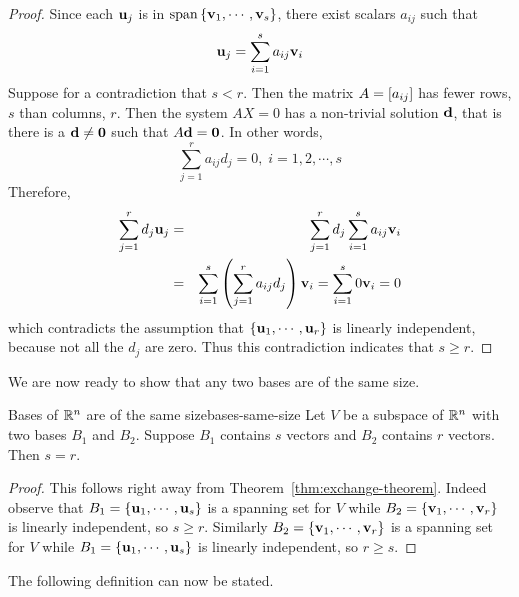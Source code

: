 \begin{proof}
  Since each $\mbox{\bf u}_j$ is in
  $\sspan\set{\vect{v}_{1},\cdots ,\vect{v}_{s}} $, there exist
  scalars $a_{ij}$ such that
  \begin{equation*}
    \mbox{\bf u}_{j}=\sum_{i=1}^{s}a_{ij}\mbox{\bf v}_{i}
  \end{equation*}
  Suppose for a contradiction that $s<r$. Then the matrix
  $A = \left[ a_{ij} \right]$ has fewer rows, $s$ than columns, $r$. Then the
  system $AX=0$ has %
  a non-trivial solution $\mbox{\bf d}$, that is there is a
  $\mbox{\bf d}\neq \mbox{\bf 0}$ such that $A\mbox{\bf d}=\mbox{\bf 0}$. In other
  words,
  \begin{equation*}
    \sum_{j=1}^{r}a_{ij}d_{j}=0,\;i=1,2,\cdots ,s
  \end{equation*}
  Therefore, 
  \begin{eqnarray*}
    \sum_{j=1}^{r}d_{j}\mbox{\bf u}_{j}
    &=&\sum_{j=1}^{r}d_{j}\sum_{i=1}^{s}a_{ij}
        \mbox{\bf v}_{i} \\
    &=&\sum_{i=1}^{s}\left(\sum_{j=1}^{r}a_{ij}d_{j}\right) \mbox{\bf v}
        _{i}=\sum_{i=1}^{s}0\mbox{\bf v}_{i}=0
  \end{eqnarray*}
  which contradicts the assumption that
  $\left\{\mbox{\bf u}_{1},\cdots ,\mbox{\bf u}_{r}\right\} $ is linearly independent,
  because not all the $d_{j}$ are zero. Thus this contradiction
  indicates that $s\geq r$.
\end{proof}

We are now ready to show that any two bases are of the same size.

\begin{theorem}{Bases of $\mathbb{R}^{n}$ are of the same size}{bases-same-size}
  Let $V$ be a subspace of $\mathbb{R}^{n}$ with two bases $B_1$ and
  $B_2$. Suppose $B_1$ contains $s$ vectors and $B_2$ contains $r$
  vectors. Then $s=r$.
\end{theorem}

\begin{proof}
  This follows right away from
  Theorem~\ref{thm:exchange-theorem}. Indeed observe that
  $B_1 = \left\{ \mbox{\bf u}_{1},\cdots ,\mbox{\bf u}_{s}\right\} $ is a spanning set
  for $V$ while $ B_2 = \left\{\mbox{\bf v}_{1},\cdots ,\mbox{\bf v}_{r}\right\} $ is
  linearly independent, so $s \geq r$. Similarly
  $B_2 = \left\{\mbox{\bf v}_{1},\cdots ,\mbox{\bf v} _{r}\right\} $ is a spanning set
  for $V$ while $B_1 = \left\{\mbox{\bf u}_{1},\cdots , \mbox{\bf u}_{s}\right\} $ is
  linearly independent, so $r\geq s$.
\end{proof}

The following definition can now be stated.

